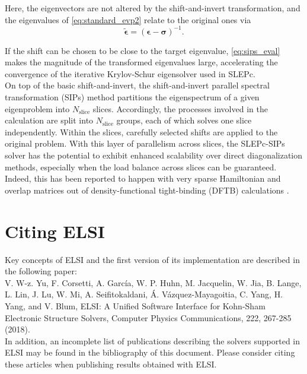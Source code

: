 \documentclass{report}
\begin{document}
\noindent Here, the eigenvectors are not altered by the shift-and-invert transformation, and the eigenvalues of \ref{eq:standard_evp2} relate to the original ones via\\
\begin{equation}
\label{eq:sips_eval}
\boldsymbol{\tilde{\epsilon}} = (\boldsymbol{\epsilon - \sigma})^{-1} .
\end{equation}

If the shift can be chosen to be close to the target eigenvalue, \ref{eq:sips_eval} makes the magnitude of the transformed eigenvalues large, accelerating the convergence of the iterative Krylov-Schur eigensolver used in SLEPc.\\

On top of the basic shift-and-invert, the shift-and-invert parallel spectral transformation (SIPs) method \cite{sips_keceli_2016} partitions the eigenspectrum of a given eigenproblem into $N_\text{slice}$ slices.  Accordingly, the processes involved in the calculation are split into $N_\text{slice}$ groups, each of which solves one slice independently.  Within the slices, carefully selected shifts are applied to the original problem.  With this layer of parallelism across slices, the SLEPc-SIPs solver has the potential to exhibit enhanced scalability over direct diagonalization methods, especially when the load balance across slices can be guaranteed.  Indeed, this has been reported to happen with very sparse Hamiltonian and overlap matrices out of density-functional tight-binding (DFTB) calculations \cite{sips_keceli_2016}.\\

\section{Citing ELSI}
\label{sec:cite}
Key concepts of ELSI and the first version of its implementation are described in the following paper:\\

V. W-z. Yu, F. Corsetti, A. Garc\'{i}a, W. P. Huhn, M. Jacquelin, W. Jia, B. Lange, L. Lin, J. Lu, W. Mi, A. Seifitokaldani, \'{A}. V\'{a}zquez-Mayagoitia, C. Yang, H. Yang, and V. Blum, ELSI: A Unified Software Interface for Kohn-Sham Electronic Structure Solvers, Computer Physics Communications, 222, 267-285 (2018).\\

In addition, an incomplete list of publications describing the solvers supported in ELSI may be found in the bibliography of this document.  Please consider citing these articles when publishing results obtained with ELSI.\\
\end{document}
